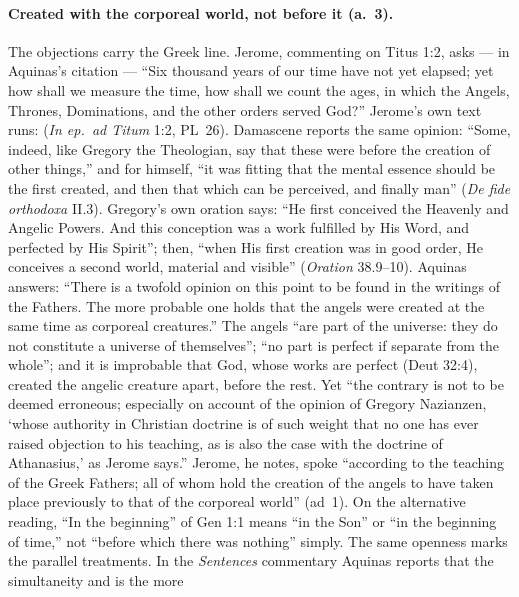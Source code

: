 \paragraph{Created with the corporeal world, not before it (a.~3).} The
objections carry the Greek line. Jerome, commenting on Titus 1:2, asks
--- in Aquinas's citation --- ``Six thousand years of our time have not
yet elapsed; yet how shall we measure the time, how shall we count the
ages, in which the Angels, Thrones, Dominations, and the other orders
served God?'' Jerome's own text runs:  (\emph{In ep.~ad
Titum} 1:2, PL~26). Damascene reports the same opinion: ``Some, indeed,
like Gregory the Theologian, say that these were before the creation of
other things,'' and for himself, ``it was fitting that the mental
essence should be the first created, and then that which can be
perceived, and finally man'' (\emph{De fide orthodoxa} II.3). Gregory's
own oration says: ``He first conceived the Heavenly and Angelic Powers.
And this conception was a work fulfilled by His Word, and perfected by
His Spirit''; then, ``when His first creation was in good order, He
conceives a second world, material and visible'' (\emph{Oration} 38.9--10).
Aquinas answers: ``There is a twofold opinion on this point to be found
in the writings of the Fathers. The more probable one holds that the
angels were created at the same time as corporeal creatures.'' The
angels ``are part of the universe: they do not constitute a universe of
themselves''; ``no part is perfect if separate from the whole''; and it
is improbable that God, whose works are perfect (Deut 32:4), created the
angelic creature apart, before the rest. Yet ``the contrary is not to be
deemed erroneous; especially on account of the opinion of Gregory
Nazianzen, `whose authority in Christian doctrine is of such weight that
no one has ever raised objection to his teaching, as is also the case
with the doctrine of Athanasius,' as Jerome says.'' Jerome, he notes,
spoke ``according to the teaching of the Greek Fathers; all of whom hold
the creation of the angels to have taken place previously to that of the
corporeal world'' (ad~1). On the alternative reading, ``In the
beginning'' of Gen 1:1 means ``in the Son'' or ``in the beginning of
time,'' not ``before which there was nothing'' simply. The same openness
marks the parallel treatments. In the \emph{Sentences} commentary Aquinas
reports that the simultaneity  and is the more
